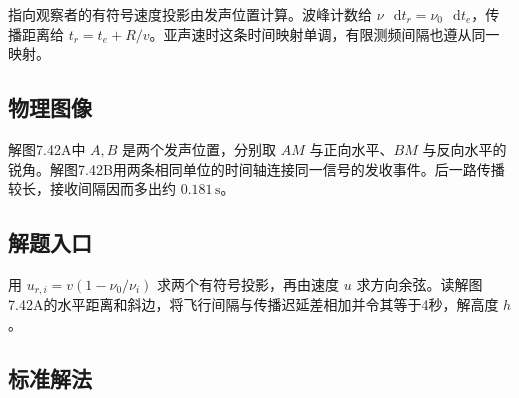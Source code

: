 \documentclass[UTF8,fontset=fandol,a4paper,11pt]{ctexart}
\newcommand{\dd}{\mathop{}\!\mathrm{d}}
\begin{document}
指向观察者的有符号速度投影由发声位置计算。波峰计数给 $\nu\,\dd t_r=\nu_0\,\dd t_e$，传播距离给 $t_r=t_e+R/v$。亚声速时这条时间映射单调，有限测频间隔也遵从同一映射。




\subsection*{物理图像}

解图7.42A中 $A,B$ 是两个发声位置，分别取 $AM$ 与正向水平、$BM$ 与反向水平的锐角。解图7.42B用两条相同单位的时间轴连接同一信号的发收事件。后一路传播较长，接收间隔因而多出约 $0.181\,\mathrm s$。




\subsection*{解题入口}

用 $u_{r,i}=v(1-\nu_0/\nu_i)$ 求两个有符号投影，再由速度 $u$ 求方向余弦。读解图7.42A的水平距离和斜边，将飞行间隔与传播迟延差相加并令其等于4秒，解高度 $h$。



\subsection*{标准解法}
\end{document}
